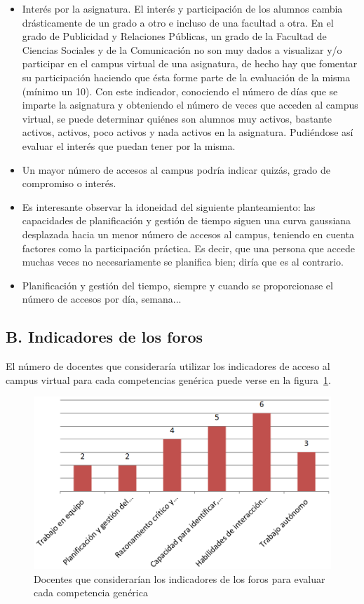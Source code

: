 \begin{itemize}
\item Interés por la asignatura. El interés y participación de los alumnos cambia drásticamente de un grado a otro e incluso de una facultad a otra. En el grado de Publicidad y Relaciones Públicas, un grado de la Facultad de Ciencias Sociales y de la Comunicación no son muy dados a visualizar y/o participar en el campus virtual de una asignatura, de hecho hay que fomentar su participación haciendo que ésta forme parte de la evaluación de la misma (mínimo un 10\percentage). Con este indicador, conociendo el número de días que se imparte la asignatura y obteniendo el número de veces que acceden al campus virtual, se puede determinar quiénes son alumnos muy activos, bastante activos, activos, poco activos y nada activos en la asignatura. Pudiéndose así evaluar el interés que puedan tener por la misma.
\item Un mayor número de accesos al campus podría indicar quizás, grado de compromiso o interés.
\item Es interesante observar la idoneidad del siguiente planteamiento: las capacidades de planificación y gestión de tiempo siguen una curva gaussiana desplazada hacia un menor número de accesos al campus, teniendo en cuenta factores como la participación práctica. Es decir, que una persona que accede muchas veces no necesariamente se planifica bien; diría que es al contrario.
\item Planificación y gestión del tiempo, siempre y cuando se proporcionase el número de accesos por día, semana...
\end{itemize}

	\subsection*{B. Indicadores de los foros}

El número de docentes que consideraría utilizar los indicadores de acceso al campus virtual para cada competencias genérica puede verse en la figura~\ref{fig:ape:aa:foros}.

\begin{figure}[ht]
    \includegraphics[scale=0.4]{aa_foros.png}
  \caption{Docentes que considerarían los indicadores de los foros para evaluar cada competencia genérica}
  \label{fig:ape:aa:foros}
\end{figure}

